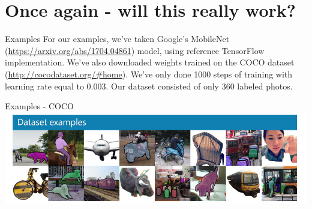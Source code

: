 \documentclass[aspectratio=1610,english]{beamer} %
\begin{document}
 \section{Once again - will this really work?}
  	\begin{frame}{Examples}
		For our examples, we've taken Google's MobileNet (\url{https://arxiv.org/abs/1704.04861}) model, using reference TensorFlow implementation. We've also downloaded weights trained on the COCO dataset (\url{http://cocodataset.org/\#home}).
		We've only done 1000 steps of training with learning rate equal to 0.003.
		Our dataset consisted of only 360 labeled photos.
	\end{frame}
	\begin{frame}{Examples - COCO}
		\includegraphics[scale=0.5]{images/coco-examples}
	\end{frame}
\end{document}
